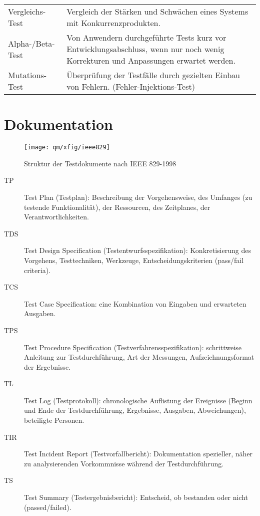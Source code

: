 \newpage
\begin{tabularx}{\linewidth}{l|X}
 Vergleichs-Test & Vergleich der Stärken und Schwächen eines Systems
    mit Konkurrenzprodukten.\\
  Alpha-/Beta-Test & Von Anwendern durchgeführte Tests kurz vor
  Entwicklungsabschluss, wenn nur noch wenig Korrekturen und Anpassungen
  erwartet werden.\\
 Mutations-Test &\"Uberprüfung der Testfälle
  durch gezielten Einbau von Fehlern. (Fehler-Injektions-Test) \\
\end{tabularx}
%
\section{Dokumentation}
\begin{figure}[H]
\centering
\texttt{[image: qm/xfig/ieee829]}
\ifslides
\else
\caption{Struktur der Testdokumente nach IEEE 829-1998}
\fi
\end{figure}
\begin{description}
\item[TP] Test Plan (Testplan): Beschreibung der Vorgehensweise, des Umfanges
  (zu testende Funktionalität), der Ressourcen, des Zeitplanes, der
  Verantwortlichkeiten.
\item[TDS] Test Design Specification (Testentwurfsspezifikation):
  Konkretisierung des Vorgehens, Testtechniken, Werkzeuge,
  Entscheidungskriterien (pass/fail criteria).
\item[TCS] Test Case Specification: eine Kombination von Eingaben und
  erwarteten Ausgaben.
\item[TPS] Test Procedure Specification (Testverfahrensspezifikation):
  schrittweise Anleitung zur Testdurchführung, Art der Messungen,
  Aufzeichnungsformat der Ergebnisse.
\ifslides
\newpage
\fi
\item[TL] Test Log (Testprotokoll): chronologische Auflistung der Ereignisse
  (Beginn und Ende der Testdurchführung, Ergebnisse, Ausgaben, Abweichungen),
  beteiligte Personen.
\item[TIR] Test Incident Report (Testvorfallbericht): Dokumentation
  spezieller, näher zu analysierenden Vorkommnisse während der
  Testdurchführung.
\item[TS] Test Summary (Testergebnisbericht): Entscheid, ob bestanden oder
  nicht (passed/failed).
\end{description}
\newpage

